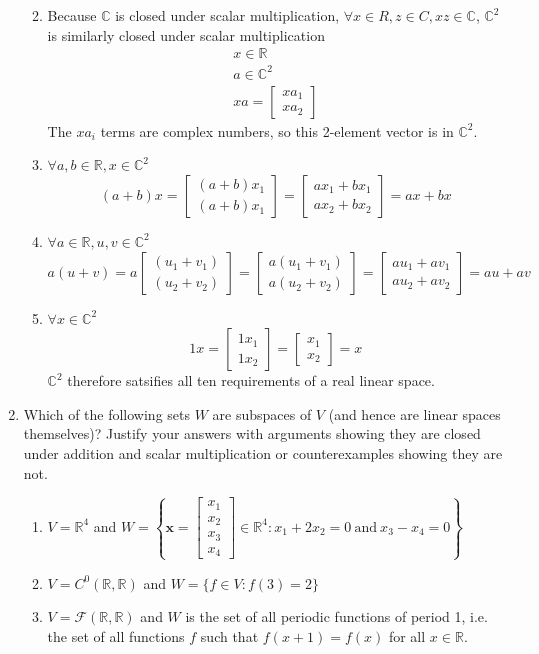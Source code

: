 \documentclass[]{article}
\newcommand{\R}{\mathbb{R}}
\newcommand{\C}{\mathbb{C}}
\newcommand{\bbm}{\begin{bmatrix}}
\newcommand{\ebm}{\end{bmatrix}}
\newcommand{\x}{\bm{x}}
\begin{document}
\begin{enumerate}[resume]
\begin{enumerate}
\[        \]
      \item Because $\C$ is closed under scalar multiplication,
        $\forall x \in R, z \in C, xz \in \C$, $\C^2$ is similarly
        closed under scalar multiplication
        \begin{gather}
          x \in \R \\
          a \in \C^2 \\
          x a = \bbm x a_1 \\ x a_2 \ebm
        \end{gather}
        The $x a_i$ terms are complex numbers, so this 2-element vector is in $\C^2$.
      \item $\forall a,b \in \R, x \in \C^2$
        \[
        (a + b)x = \bbm (a + b)x_1 \\ (a + b)x_1 \ebm  = \bbm a x_1 + b x_1 \\ ax_2 + bx_2 \ebm = ax + b x
        \]
      \item $\forall a \in \R, u,v \in \C^2$
        \[
        a ( u + v ) = a \bbm (u_1 + v_1) \\ (u_2 + v_2) \ebm = \bbm a (u_1 + v_1) \\ a (u_2 + v_2) \ebm = \bbm au_1 + av_1 \\ au_2 + av_2 \ebm = au + av
        \]
      \item $\forall x \in \C^2$
        \[
        1 x = \bbm 1 x_1 \\ 1 x_2 \ebm = \bbm x_1 \\ x_2 \ebm = x
        \]
        $\C^2$ therefore satsifies all ten requirements of a real linear space.
      \end{enumerate}
      
	\item Which of the following sets $W$ are subspaces of $V$ (and hence are linear spaces themselves)? Justify your answers with arguments showing they are closed under addition and scalar multiplication or counterexamples showing they are not.
	  \begin{enumerate}
	  \item $V = \R^4$ and $W = \left\{ \x=\bbm x_1\\x_2\\x_3\\x_4 \ebm\in\R^4: x_1+2x_2 = 0 ~\mathrm{and}~ x_3-x_4=0 \right\}$
	  \item $V=C^0(\R,\R)$ and $W = \{ f\in V : f(3) = 2\}$
	  \item $V = \mathcal{F}(\R,\R)$ and $W$ is the set of all periodic functions of period 1, i.e. the set of all functions $f$ such that $f(x+1)=f(x)$ for all $x\in\R$.
	  \end{enumerate}


\end{enumerate}
\end{document}
